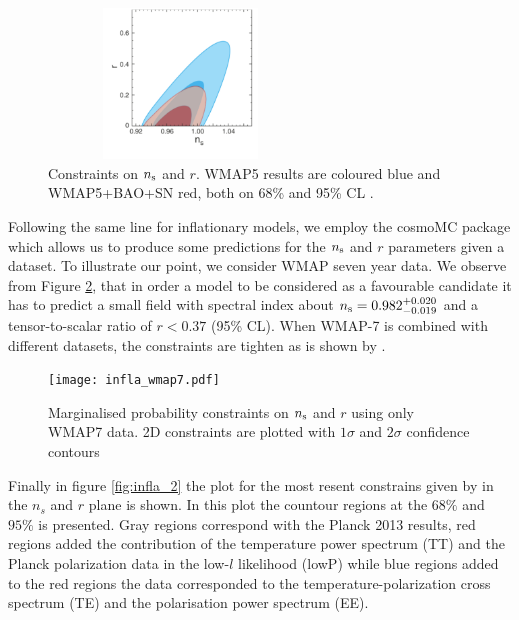 \documentclass{rmaa}
\begin{document}
\begin{figure}[h!]
\begin{center}
 \includegraphics[trim = 1mm 10mm -10mm -3mm, clip, width=7cm, height=4cm]{komatsu1.pdf}
\caption{Constraints on $n_{\rm s}$ and $r$.
WMAP5 results are coloured blue and WMAP5+BAO+SN red, both on 68\% and 95\% CL \citep{Komatsu}.
}\label{fig:Komatsu}
\end{center}
\end{figure}

Following the same line for inflationary models, we employ the {\sc cosmoMC} package \citep{Lewis}
which allows us to produce some predictions for the $n_{\rm s}$ and $r$ parameters given 
a dataset. To illustrate our point, we consider WMAP seven year data. 
We observe from Figure \ref{fig:infla}, that in order a 
model to be considered as a favourable candidate 
it has to predict a small field with spectral index about  $n_{\rm s}=0.982^{+0.020}_{-0.019}$ 
 and a tensor-to-scalar ratio of $r<0.37$ (95\% CL).
When WMAP-7 is combined with different datasets, the constraints are tighten as is 
shown by \citep{Larson}. 



\begin{figure}[h!]
\begin{center}
 \texttt{[image: infla\_wmap7.pdf]}
\caption{Marginalised probability constraints on $n_{\rm s}$ and $r$ using only WMAP7 data. 
2D constraints are plotted with $1\sigma$ and
$2\sigma$ confidence contours
}\label{fig:infla}
\end{center}
\end{figure}	

Finally in figure \ref{fig:infla_2} the plot for the most resent constrains given by \citep{PlanckC} in the $n_s$ and $r$ plane is shown. In this plot the countour regions at the $68\%$ and $95\%$ is presented. Gray regions correspond with the Planck 2013 results, red regions added the contribution of the temperature power spectrum (TT) and the Planck polarization data in the low-$l$ likelihood (lowP) while blue regions added to the red regions the data corresponded to the temperature-polarization cross spectrum (TE) and the polarisation power spectrum (EE).
\end{document}
